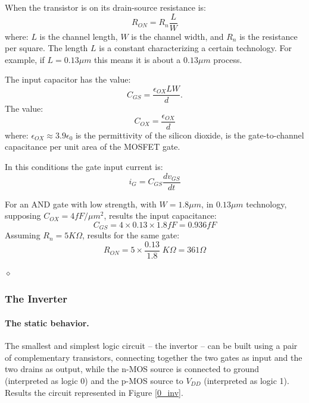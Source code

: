 When the transistor is on its drain-source resistance is:
$$R_{ON} = R_{n}\frac{L}{W}$$
where: $L$ is the channel length, $W$ is the channel width, and $R_{n}$
is the resistance per square. The length $L$ is a constant
characterizing a certain technology. For example, if $L = 0.13\mu m$
this means it is about a $0.13\mu m$ process.

The input capacitor has the value:
$$C_{GS} = \frac{\epsilon_{OX} LW}{d}.$$
The value:
$$C_{OX} = \frac{\epsilon_{OX}}{d}$$
where: $\epsilon_{OX} \approx 3.9 \epsilon_{0}$ is the permittivity of
the silicon dioxide, is  the gate-to-channel capacitance per unit area
of the MOSFET gate.

In this conditions the gate input current is:
$$i_{G} = C_{GS} \frac{dv_{GS}}{dt}$$



\begin{exemplu}
For an AND gate with low strength, with $W = 1.8\mu m$, in $0.13
\mu m$ technology, supposing $C_{OX} = 4fF/\mu m^{2}$, results the
input capacitance: $$C_{GS} = 4 \times 0.13 \times 1.8 fF = 0.936
fF$$ Assuming $R_{n} = 5K\Omega$, results for the same gate:
$$R_{ON} = 5 \times \frac{0.13}{1.8} \; K\Omega = 361 \Omega$$

$\diamond$
\end{exemplu}

\subsubsection{The Inverter}


\paragraph{The static behavior.}
The smallest and simplest logic circuit -- the invertor -- can be built
using a pair of complementary transistors, connecting together the two
gates as input and the two drains as output, while the n-MOS source is
connected to ground (interpreted as logic 0) and the p-MOS source to
$V_{DD}$ (interpreted as logic 1). Results the circuit represented in
Figure \ref{0_inv}.


